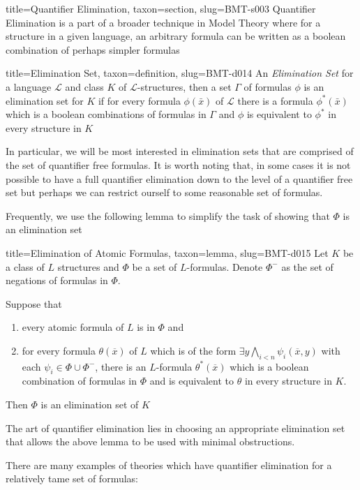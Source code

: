 \documentclass[a4paper]{article}
\begin{document}
  
  
\begin{tree}{title={Quantifier Elimination}, taxon={section}, slug={BMT-s003}}
Quantifier Elimination is a part of a broader technique in Model Theory where for a structure in a given language, an arbitrary formula can be written as a boolean combination of perhaps simpler formulas
\begin{tree}{title={Elimination Set}, taxon={definition}, slug={BMT-d014}}
An \emph{Elimination Set} for a language \(\mathcal {L}\) and class \(K\) of \(\mathcal {L}\)-structures, then a set \(\Gamma\) of formulas \(\phi\) is an elimination set for \(K\) if for every formula \(\phi ( \bar {x})\) of \(\mathcal {L}\) there is a formula \(\phi ^*( \bar {x})\) which is a boolean combinations of formulas in \(\Gamma\) and \(\phi\) is equivalent to \(\phi ^*\) in every structure in \(K\)
\end{tree}
\par{In particular, we will be most interested in elimination sets that are comprised of the set of quantifier free formulas. It is worth noting that, in some cases it is not possible to have a full quantifier elimination down to the level of a quantifier free set but perhaps we can restrict ourself to some reasonable set of formulas.}\par{Frequently, we use the following lemma to simplify the task of showing that \(\Phi\) is an elimination set}
\begin{tree}{title={Elimination of Atomic Formulas}, taxon={lemma}, slug={BMT-d015}}
Let \(K\) be a class of \(L\) structures and \(\Phi\) be a set of \(L\)-formulas. Denote \(\Phi ^-\) as the set of negations of formulas in \(\Phi\).\par{Suppose that 
  \begin{enumerate}
\item{every atomic formula of \(L\) is in \(\Phi\) and} 
    \item{for every formula \(\theta ( \overline {x})\) of \(L\) which is of the form \(\exists  y  \bigwedge _{i<n}  \psi _i ( \overline {x},y)\) with each \(\psi _i  \in   \Phi \cup   \Phi ^-\), there is an \(L\)-formula \(\theta ^*( \overline {x})\) which is a boolean combination of formulas in \(\Phi\) and is equivalent to \(\theta\) in every structure in \(K\).}
\end{enumerate}
  Then \(\Phi\) is an elimination set of \(K\)}
\end{tree}
\par{The art of quantifier elimination lies in choosing an appropriate elimination set that allows the above lemma to be used with minimal obstructions. }\par{There are many examples of theories which have quantifier elimination for a relatively tame set of formulas: }
  

\end{tree}
\end{document}
